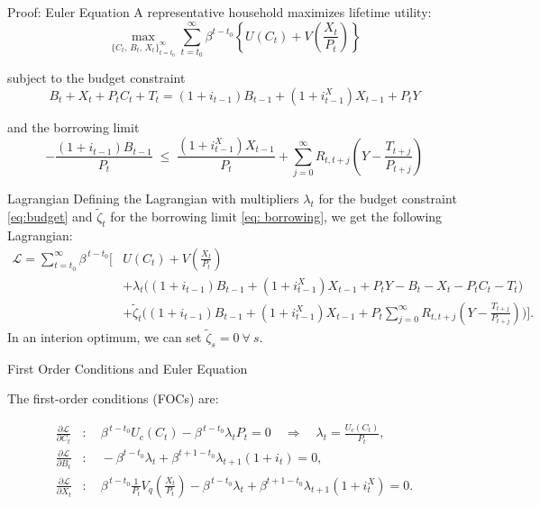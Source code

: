\documentclass[11pt,aspectratio=169]{beamer}
\begin{document}
\begin{frame}[label=euler_proof]{Proof: Euler Equation}
A representative household maximizes lifetime utility: 
\begin{equation} \label{eq:utility}
\max_{\{C_t,\,B_t,\,X_t\}_{t=t_0}^\infty} 
\sum_{t=t_0}^{\infty} 
\beta^{t-t_0} 
\left\{
U(C_t) 
+ V\!\left(\frac{X_t}{P_t}\right)
\right\}
\end{equation}

subject to the budget constraint
\begin{equation} \label{eq:budget}
B_t + X_t + P_t C_t + T_t
= (1+i_{t-1})B_{t-1} + (1+i_{t-1}^{X})X_{t-1} + P_t Y
\end{equation}

and the borrowing limit
\begin{equation} \label{eq: borrowing}
-\frac{(1+i_{t-1})B_{t-1}}{P_t} 
\;\le\;
\frac{(1+i_{t-1}^{X})X_{t-1}}{P_t}
+ \sum_{j=0}^{\infty} R_{t,t+j} 
\left( Y - \frac{T_{t+j}}{P_{t+j}} \right)
\end{equation}
\end{frame}

\begin{frame}{Lagrangian}
Defining the Lagrangian with multipliers $\lambda_t$ for the budget constraint \eqref{eq:budget} and $\tilde{\zeta}_t$ for the borrowing limit \eqref{eq: borrowing}, we get the following Lagrangian:
\begin{equation} \label{eq:lagrangian}
\begin{aligned}
\mathcal{L} = \sum_{t=t_0}^{\infty} \beta^{\,t-t_0}\Bigg[ & U(C_t) 
+ V\!\left(\frac{X_t}{P_t}\right) \\
&
+ \lambda_t \Big((1+i_{t-1})B_{t-1} + (1+i_{t-1}^{X})X_{t-1} + P_t Y - B_t - X_t - P_t C_t - T_t \Big) \\
& + \tilde{\zeta}_t \Big((1+i_{t-1})B_{t-1}+
(1+i_{t-1}^{X})X_{t-1}
+ P_t\sum_{j=0}^{\infty} R_{t,t+j} 
\left( Y - \frac{T_{t+j}}{P_{t+j}}  \right) \Big) \Bigg].
\end{aligned}
\end{equation}
In an interion optimum, we can set $\tilde{\zeta}_s = 0  \ \forall \  s$.
\end{frame}
\begin{frame}{First Order Conditions and Euler Equation}

The first-order conditions (FOCs) are:

\begin{align}
\frac{\partial \mathcal{L}}{\partial C_t} &: \quad 
\beta^{\,t-t_0} U_c(C_t) - \beta^{\,t-t_0} \lambda_t P_t = 0 
\quad \Rightarrow \quad \lambda_t = \frac{U_c(C_t)}{P_t}, \label{eq:foc_c} \\[1mm]
\frac{\partial \mathcal{L}}{\partial B_t} &: \quad 
- \beta^{t-t_0}\lambda_t + \beta^{t+1-t_0} \lambda_{t+1}(1+i_t)  = 0, \label{eq:foc_b} \\[1mm]
\frac{\partial \mathcal{L}}{\partial X_t} &: \quad 
\beta^{\,t-t_0} \frac{1}{P_t}V_q\left(\frac{X_t}{P_t}\right) - \beta^{\,t-t_0} \lambda_t + \beta^{t+1-t_0} \lambda_{t+1}(1+i_t^X)  = 0 
. \label{eq:foc_x}
\end{align}

\end{frame}
\end{document}
